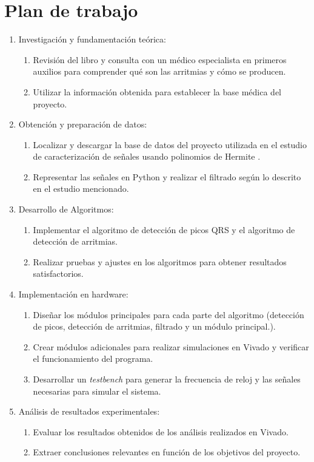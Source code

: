 \section{Plan de trabajo}
\begin{enumerate}
	\item Investigación y fundamentación teórica:
	
	\begin{enumerate}
		\item Revisión del libro\cite{velez} y consulta con un médico especialista en primeros auxilios para comprender qué son las arritmias y cómo se producen.
	
		\item Utilizar la información obtenida para establecer la base médica del proyecto.
	\end{enumerate}

	\item Obtención y preparación de datos:
	\begin{enumerate}
		\item Localizar y descargar la base de datos del proyecto utilizada en el estudio de caracterización de señales usando polinomios de Hermite \cite{desai2021low}.

		\item Representar las señales en Python y realizar el filtrado según lo descrito en el estudio mencionado.
	\end{enumerate}
	\item Desarrollo de Algoritmos:
	\begin{enumerate}
		\item Implementar el algoritmo de detección de picos QRS y el algoritmo de detección de arritmias.

		\item Realizar pruebas y ajustes en los algoritmos para obtener resultados satisfactorios.
	\end{enumerate}
	
	\item Implementación en hardware: 
	\begin{enumerate}
		\item Diseñar los módulos principales para cada parte del algoritmo (detección de picos, detección de arritmias, filtrado y un módulo principal.).

		\item Crear módulos adicionales para realizar simulaciones en Vivado y verificar el funcionamiento del programa.
		\item Desarrollar un \textit{testbench} para generar la frecuencia de reloj y las señales necesarias para simular el sistema.
	\end{enumerate}

	\item Análisis de resultados experimentales:
	\begin{enumerate}
		\item Evaluar los resultados obtenidos de los análisis realizados en Vivado.

		\item Extraer conclusiones relevantes en función de los objetivos del proyecto.
	\end{enumerate}
\end{enumerate}

